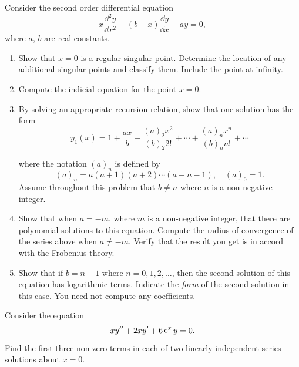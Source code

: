 {\begin{Exercise}
\end{Exercise}














\begin{Exercise}
  \label{exercise xybxyay=0}
  Consider the second order differential equation
  \[
  x \frac{\dd^2 y}{\dd x^2} + (b - x) \frac{\dd y}{\dd x} - a y = 0,
  \]
  where $a$, $b$ are real constants.
  \begin{enumerate}
  \item
    Show that $x = 0$ is a regular singular point.  Determine the location of
    any additional singular points and classify them.  Include the 
    point at infinity.
  \item
    Compute the indicial equation for the point $x = 0$.
  \item
    By solving an appropriate recursion relation, show that one solution has
    the form
    \[
    y_1(x) = 1 + \frac{a x}{b} + \frac{ (a)_2 x^2 }{ (b)_2 2! } + \cdots
    + \frac{ (a)_n x^n }{ (b)_n n! } + \cdots
    \]

    where the notation $(a)_n$ is defined by
    \[
    (a)_n = a(a+1)(a+2) \cdots (a+n-1), \quad (a)_0 = 1.
    \]
    Assume throughout this problem that $b \neq n$ where $n$ is a non-negative
    integer.
  \item
    Show that when $a = -m$, where $m$ is a non-negative integer, that there are
    polynomial solutions to this equation.  Compute the radius of convergence of 
    the series above when $a \neq -m$.  Verify that the result you get is in 
    accord with the Frobenius theory.
  \item
    Show that if $b = n+1$ where $n = 0, 1, 2, \ldots$, then the second 
    solution of this equation has logarithmic terms.  Indicate the \textit{form}
    of the second solution in this case.  You need  not compute any 
    coefficients.
  \end{enumerate}

\end{Exercise}




\begin{Exercise}
  \label{exercise xy+2xy+6exy=0}
  Consider the equation
  \[ 
  x y'' + 2 x y' + 6 \mathop{\mathrm{e}}\nolimits^x y = 0.
  \]
  Find the first three non-zero terms in each of two linearly independent
  series solutions about $x = 0$. 

\end{Exercise}














\raggedbottom
}
